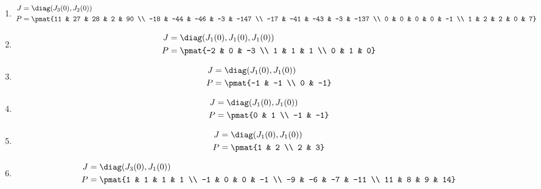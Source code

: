 \begin{enumerate}
\item

\begin{align*}
J &= \diag(J_{3}(0), J_{2}(0))\\
P &= \pmat{11 & 27 & 28 & 2 & 90 \\ -18 & -44 & -46 & -3 & -147 \\ -17 & -41 & -43 & -3 & -137 \\ 0 & 0 & 0 & 0 & -1 \\ 1 & 2 & 2 & 0 & 7}
\end{align*}

\item

\begin{align*}
J &= \diag(J_{1}(0), J_{1}(0), J_{1}(0))\\
P &= \pmat{-2 & 0 & -3 \\ 1 & 1 & 1 \\ 0 & 1 & 0}
\end{align*}

\item

\begin{align*}
J &= \diag(J_{1}(0), J_{1}(0))\\
P &= \pmat{-1 & -1 \\ 0 & -1}
\end{align*}

\item

\begin{align*}
J &= \diag(J_{1}(0), J_{1}(0))\\
P &= \pmat{0 & 1 \\ -1 & -1}
\end{align*}

\item

\begin{align*}
J &= \diag(J_{1}(0), J_{1}(0))\\
P &= \pmat{1 & 2 \\ 2 & 3}
\end{align*}

\item

\begin{align*}
J &= \diag(J_{3}(0), J_{1}(0))\\
P &= \pmat{1 & 1 & 1 & 1 \\ -1 & 0 & 0 & -1 \\ -9 & -6 & -7 & -11 \\ 11 & 8 & 9 & 14}
\end{align*}


\end{enumerate}
